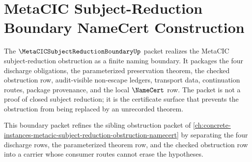 \chapter{MetaCIC Subject-Reduction Boundary NameCert Construction}
\label{ch:concrete-instances-metacic-subject-reduction-boundary-namecert}

The $\MetaCICSubjectReductionBoundaryUp$ packet realizes the MetaCIC subject-reduction obstruction as a finite naming boundary. It packages the four discharge obligations, the parameterized preservation theorem, the checked obstruction row, audit-visible non-escape ledgers, transport data, continuation routes, package provenance, and the local $\NameCert$ row. The packet is not a proof of closed subject reduction; it is the certificate surface that prevents the obstruction from being replaced by an unrecorded theorem.

This boundary packet refines the sibling obstruction packet of \autoref{ch:concrete-instances-metacic-subject-reduction-obstruction-namecert} by separating the four discharge rows, the parameterized theorem row, and the checked obstruction row into a carrier whose consumer routes cannot erase the hypotheses.

